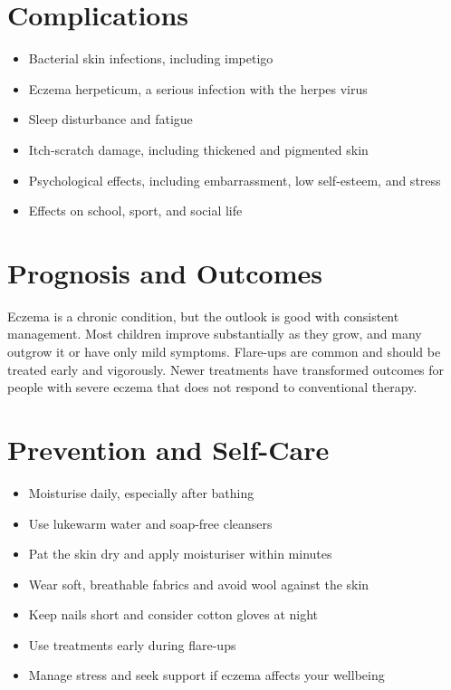 \section*{Complications}
\begin{itemize}
    \item Bacterial skin infections, including impetigo
    \item Eczema herpeticum, a serious infection with the herpes virus
    \item Sleep disturbance and fatigue
    \item Itch-scratch damage, including thickened and pigmented skin
    \item Psychological effects, including embarrassment, low self-esteem, and stress
    \item Effects on school, sport, and social life
\end{itemize}

\section*{Prognosis and Outcomes}
Eczema is a chronic condition, but the outlook is good with consistent management. Most children improve substantially as they grow, and many outgrow it or have only mild symptoms. Flare-ups are common and should be treated early and vigorously. Newer treatments have transformed outcomes for people with severe eczema that does not respond to conventional therapy.

\section*{Prevention and Self-Care}
\begin{itemize}
    \item Moisturise daily, especially after bathing
    \item Use lukewarm water and soap-free cleansers
    \item Pat the skin dry and apply moisturiser within minutes
    \item Wear soft, breathable fabrics and avoid wool against the skin
    \item Keep nails short and consider cotton gloves at night
    \item Use treatments early during flare-ups
    \item Manage stress and seek support if eczema affects your wellbeing
\end{itemize}

